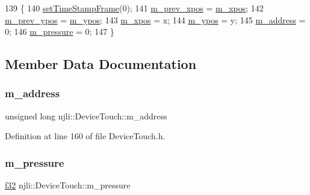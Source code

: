 \begin{DoxyCode}
139     \{
140       \mbox{\hyperlink{classnjli_1_1_device_input_time_a03eca1e2b0725a5be925f6ec5cd33b7b}{setTimeStampFrame}}(0);
141       \mbox{\hyperlink{classnjli_1_1_device_touch_aefd5c83cec6edc7dcb7edeec2144c470}{m\_prev\_xpos}} = \mbox{\hyperlink{classnjli_1_1_device_touch_aa459469f52287f2085402117c13512f8}{m\_xpos}};
142       \mbox{\hyperlink{classnjli_1_1_device_touch_adc6f1bce3fa81e81f1a01ca55b2b3db7}{m\_prev\_ypos}} = \mbox{\hyperlink{classnjli_1_1_device_touch_aec3c40c2adb1ba1bf5a13bf366bd3b6d}{m\_ypos}};
143       \mbox{\hyperlink{classnjli_1_1_device_touch_aa459469f52287f2085402117c13512f8}{m\_xpos}} = x;
144       \mbox{\hyperlink{classnjli_1_1_device_touch_aec3c40c2adb1ba1bf5a13bf366bd3b6d}{m\_ypos}} = y;
145       \mbox{\hyperlink{classnjli_1_1_device_touch_adf8b9a7a96b90d0639aca0b9982a95d7}{m\_address}} = 0;
146       \mbox{\hyperlink{classnjli_1_1_device_touch_a1fbc998f1460afc213b0ba31410599bd}{m\_pressure}} = 0;
147     \}
\end{DoxyCode}


\subsection{Member Data Documentation}
\mbox{\label{classnjli_1_1_device_touch_adf8b9a7a96b90d0639aca0b9982a95d7}} 
\subsubsection{\texorpdfstring{m\+\_\+address}{m\_address}}
{\footnotesize\ttfamily unsigned long njli\+::\+Device\+Touch\+::m\+\_\+address\hspace{0.3cm}{\ttfamily [private]}}



Definition at line 160 of file Device\+Touch.\+h.

\mbox{\label{classnjli_1_1_device_touch_a1fbc998f1460afc213b0ba31410599bd}} 
\subsubsection{\texorpdfstring{m\+\_\+pressure}{m\_pressure}}
{\footnotesize\ttfamily \mbox{\hyperlink{_util_8h_a5f6906312a689f27d70e9d086649d3fd}{f32}} njli\+::\+Device\+Touch\+::m\+\_\+pressure\hspace{0.3cm}{\ttfamily [private]}}



